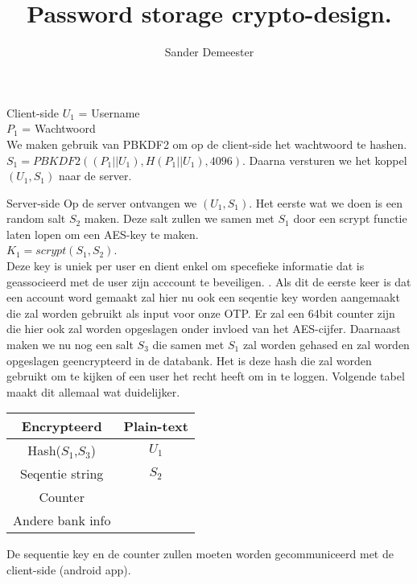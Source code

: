 \documentclass[10pt,a4paper]{report}
\author{Sander Demeester}
\title{Password storage crypto-design.}
\begin{document}
\begin{subsection}{Client-side}
$U_1$ = Username \\
$P_1$ = Wachtwoord \\
We maken gebruik van PBKDF2 om op de client-side het wachtwoord te hashen.
$S_{1} = PBKDF2((P_1 || U_1), H(P_1 || U_1),4096)$.
Daarna versturen we het koppel $(U_1,S_1)$ naar de server.
\end{subsection}
\begin{subsection}{Server-side}
Op de server ontvangen we $(U_1,S_1)$.
Het eerste wat we doen is een random salt $S_2$ maken. Deze salt zullen we samen met $S_1$ door een scrypt functie laten lopen om een AES-key  te maken.\\ 
$K_1 = scrypt(S_1,S_2)$. \\
Deze key is uniek per user en dient enkel om specefieke informatie dat is geassocieerd met de user zijn acccount te beveiligen.
. 
Als dit de eerste keer is dat een account word gemaakt zal hier nu ook een seqentie key worden aangemaakt die zal worden gebruikt als input voor onze OTP. Er zal een 64bit counter zijn die hier ook zal worden opgeslagen onder invloed van het AES-cijfer.
Daarnaast maken we nu nog een salt $S_3$ die samen met $S_1$ zal worden gehased en zal worden opgeslagen geencrypteerd in de databank. Het is deze hash die zal worden gebruikt om te kijken of een user het recht heeft om in te loggen.
Volgende tabel maakt dit allemaal wat duidelijker.
\begin{tabular}{|c|c|}
\hline 
Encrypteerd & Plain-text \\ 
\hline 
Hash($S_1$,$S_3$) & $U_1$ \\ 
\hline 
Seqentie string & $S_2$ \\ 
\hline 
Counter &  \\ 
\hline 
Andere bank info &  \\ 
\hline 
\end{tabular} 
De sequentie key en de counter zullen moeten worden gecommuniceerd met de client-side (android app). 
\end{subsection}
\end{document}
